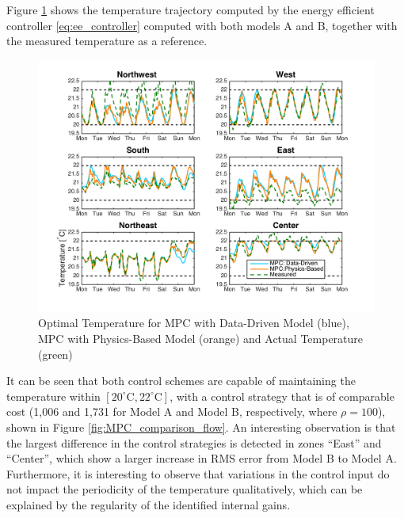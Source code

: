Figure \ref{fig:MPC_comparison_temp} shows the temperature trajectory computed by the energy efficient controller \eqref{eq:ee_controller} computed with both models A and B, together with the measured temperature as a reference. 
\begin{figure}
\centering
\vspace*{-0.4cm}
\includegraphics[scale=0.46]{chapters/building_model/figures/Comparison_Temp.png}
\vspace*{-0.5cm}
\caption{Optimal Temperature for MPC with Data-Driven Model (blue), MPC with Physics-Based Model (orange) and Actual Temperature (green)}
\vspace*{-0.2cm}
\label{fig:MPC_comparison_temp}
\end{figure}
It can be seen that both control schemes are capable of maintaining the temperature within $[20^\circ \text{C}, 22^\circ \text{C}]$, with a control strategy that is of comparable cost (1,006 and 1,731 for Model A and Model B, respectively, where $\rho=100$), shown in Figure \ref{fig:MPC_comparison_flow}. An interesting observation is that the largest difference in the control strategies is detected in zones ``East'' and ``Center'', which show a larger increase in RMS error from Model B to Model A.
Furthermore, it is interesting to observe that variations in the control input do not impact the periodicity of the temperature qualitatively, which can be explained by the regularity of the identified internal gains.

